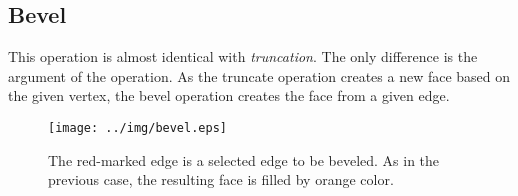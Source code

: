
\subsection{Bevel}

This operation is almost identical with \emph{truncation}. The only difference is the argument of the
operation. As the truncate operation creates a new face based on the given vertex, the bevel operation
creates the face from a given edge.\\

\begin{figure}[ht]
\centering
\texttt{[image: ../img/bevel.eps]}
\caption{The red-marked edge is a selected edge to be beveled. As in the previous case, the resulting
face is filled by orange color.}
\end{figure}


